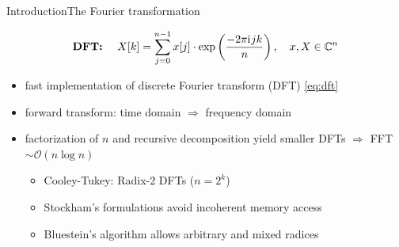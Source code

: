 \documentclass[t,11pt,hyperref={
  pdftitle = {gearshifft},
  pdfsubject = {gearshifft},
  pdfborder={0 0 0},
  colorlinks=true,
  urlcolor=red,
  citecolor=red,
  linkcolor=red,
  pdfauthor={Peter Steinbach, Matthias Werner}
  }
]{beamer}
\newcommand{\iu}{{\mathrm{i}\mkern1mu}}
\begin{document}
\begin{frame}{Introduction}{The Fourier transformation}

\vfill
  \begin{equation}
    \label{eq:dft}
    \text{\textbf{DFT:} }\quad X[k] = \sum_{j=0}^{n-1} x[j]\cdot\exp\left(\frac{-2\pi \iu jk}{n}\right),\quad x,X\in\mathbb{C}^n
  \end{equation}
\vfill  
  \begin{itemize}
  \item fast implementation of discrete Fourier transform (DFT) \eqref{eq:dft}
  \item forward transform: time domain $\Rightarrow$ frequency domain
  \item factorization of $n$ and recursive decomposition yield smaller DFTs $\Rightarrow$ FFT$\sim\mathcal{O}(n\log n)$

    \begin{itemize}
    \item Cooley-Tukey: Radix-2 DFTs ($n=2^k$)
    \item Stockham's formulations avoid incoherent memory access
    \item Bluestein's algorithm allows arbitrary and mixed radices
    \end{itemize}

  \end{itemize}
\vfill

\end{frame}
\end{document}
